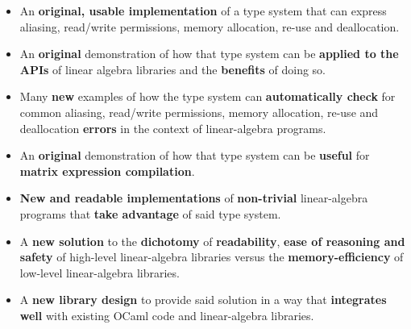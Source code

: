 \begin{itemize}

    \item An \textbf{original, usable implementation} of a type system that can express
        aliasing, read/write permissions, memory allocation, re-use and deallocation.

    \item An \textbf{original} demonstration of how that type system can be
        \textbf{applied to the APIs} of linear algebra libraries and the
        \textbf{benefits} of doing so.

    \item Many \textbf{new} examples of how the type system can \textbf{automatically
        check} for common aliasing, read/write permissions, memory allocation,
        re-use and deallocation \textbf{errors} in the context of
        linear-algebra programs.

    \item An \textbf{original} demonstration of how that type system can be
        \textbf{useful} for \textbf{matrix expression compilation}.

    \item \textbf{New and readable implementations} of \textbf{non-trivial}
        linear-algebra programs that \textbf{take advantage} of said type
        system.

    \item A \textbf{new solution} to the \textbf{dichotomy} of
        \textbf{readability}, \textbf{ease of reasoning and safety} of
        high-level linear-algebra libraries versus the
        \textbf{memory-efficiency} of low-level linear-algebra libraries.

    \item A \textbf{new library design} to provide said solution in a way that
        \textbf{integrates well} with existing OCaml code and linear-algebra
        libraries.

\end{itemize}

